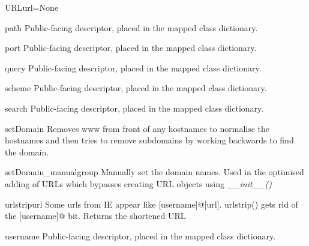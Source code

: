 \documentclass[letterpaper,10pt,english]{manual}
\begin{document}
\begin{classdesc}{URL}{url=None}
\hypertarget{webscavator.model.models.URL.path}{}\begin{memberdesc}{path}
Public-facing descriptor, placed in the mapped class dictionary.
\end{memberdesc}

\hypertarget{webscavator.model.models.URL.port}{}\begin{memberdesc}{port}
Public-facing descriptor, placed in the mapped class dictionary.
\end{memberdesc}

\hypertarget{webscavator.model.models.URL.query}{}\begin{memberdesc}{query}
Public-facing descriptor, placed in the mapped class dictionary.
\end{memberdesc}

\hypertarget{webscavator.model.models.URL.scheme}{}\begin{memberdesc}{scheme}
Public-facing descriptor, placed in the mapped class dictionary.
\end{memberdesc}

\hypertarget{webscavator.model.models.URL.search}{}\begin{memberdesc}{search}
Public-facing descriptor, placed in the mapped class dictionary.
\end{memberdesc}

\hypertarget{webscavator.model.models.URL.setDomain}{}\begin{methoddesc}{setDomain}{}
Removes www from front of any hostnames to normalise the hostnames and 
then tries to remove subdomains by working backwards to find the domain.
\end{methoddesc}

\hypertarget{webscavator.model.models.URL.setDomain_manual}{}\begin{staticmethoddesc}{setDomain\_manual}{group}
Manually set the domain names. Used in the optimised adding of URLs which bypasses 
creating URL objects using \emph{\_\_init\_\_()}
\end{staticmethoddesc}

\hypertarget{webscavator.model.models.URL.urlstrip}{}\begin{methoddesc}{urlstrip}{url}
Some urls from IE appear like {[}username{]}@{[}url{]}. urlstrip() gets rid of the 
{[}username{]}@ bit. Returns the shortened URL
\end{methoddesc}

\hypertarget{webscavator.model.models.URL.username}{}\begin{memberdesc}{username}
Public-facing descriptor, placed in the mapped class dictionary.
\end{memberdesc}
\end{classdesc}
\end{document}
